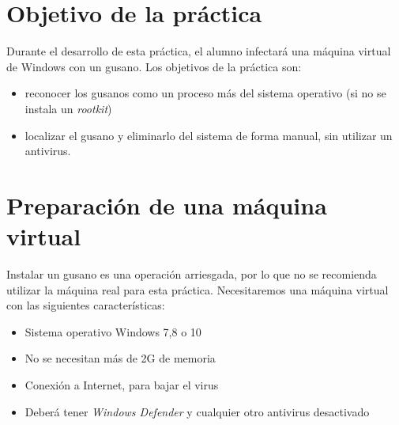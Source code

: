 
\usepackage{eurosym}




\renewcommand{\hmwkTitle}{Práctica de gusano (\textit{malware}) en Windows}


\usepackage{blindtext}






{\primerapagina}

\setlength{\parindent}{0em}
\setlength{\parskip}{1em}


\section{Objetivo de la práctica}
Durante el desarrollo de esta práctica, el alumno infectará una máquina virtual de Windows con un gusano. Los objetivos  de la práctica son:
\begin{itemize}
\item reconocer los gusanos como un proceso más del sistema operativo (si no se instala un \textit{rootkit})
\item localizar el gusano y eliminarlo del sistema de forma manual, sin utilizar un antivirus.
\end{itemize}


\section{Preparación de una máquina virtual}
Instalar un gusano es una operación arriesgada, por lo que no se recomienda utilizar la máquina real para esta práctica. Necesitaremos una máquina virtual con las siguientes características:
\begin{itemize}
\item Sistema operativo Windows 7,8 o 10
\item No se necesitan más de 2G de memoria
\item Conexión a Internet, para bajar el virus
\item Deberá tener \textit{Windows Defender} y cualquier otro antivirus desactivado
  
\end{itemize}

